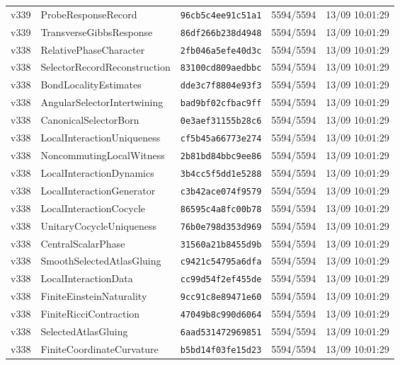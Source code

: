 \documentclass[11pt]{article}
\theoremstyle{definition}\newtheorem{deriv}{Derivação}
\begin{document}
{\begin{longtable}{@{}lllll@{}}
v339 & ProbeResponseRecord & \texttt{96cb5c4ee91c51a1} & 5594/5594 & 13/09 10:01:29 \\
v339 & TransverseGibbsResponse & \texttt{86df266b238d4948} & 5594/5594 & 13/09 10:01:29 \\
v338 & RelativePhaseCharacter & \texttt{2fb046a5efe40d3c} & 5594/5594 & 13/09 10:01:29 \\
v338 & SelectorRecordReconstruction & \texttt{83100cd809aedbbc} & 5594/5594 & 13/09 10:01:29 \\
v338 & BondLocalityEstimates & \texttt{dde3c7f8804e93f3} & 5594/5594 & 13/09 10:01:29 \\
v338 & AngularSelectorIntertwining & \texttt{bad9bf02cfbac9ff} & 5594/5594 & 13/09 10:01:29 \\
v338 & CanonicalSelectorBorn & \texttt{0e3aef31155b28c6} & 5594/5594 & 13/09 10:01:29 \\
v338 & LocalInteractionUniqueness & \texttt{cf5b45a66773e274} & 5594/5594 & 13/09 10:01:29 \\
v338 & NoncommutingLocalWitness & \texttt{2b81bd84bbc9ee86} & 5594/5594 & 13/09 10:01:29 \\
v338 & LocalInteractionDynamics & \texttt{3b4cc5f5dd1e5288} & 5594/5594 & 13/09 10:01:29 \\
v338 & LocalInteractionGenerator & \texttt{c3b42ace074f9579} & 5594/5594 & 13/09 10:01:29 \\
v338 & LocalInteractionCocycle & \texttt{86595c4a8fc00b78} & 5594/5594 & 13/09 10:01:29 \\
v338 & UnitaryCocycleUniqueness & \texttt{76b0e798d353d969} & 5594/5594 & 13/09 10:01:29 \\
v338 & CentralScalarPhase & \texttt{31560a21b8455d9b} & 5594/5594 & 13/09 10:01:29 \\
v338 & SmoothSelectedAtlasGluing & \texttt{c9421c54795a6dfa} & 5594/5594 & 13/09 10:01:29 \\
v338 & LocalInteractionData & \texttt{cc99d54f2ef455de} & 5594/5594 & 13/09 10:01:29 \\
v338 & FiniteEinsteinNaturality & \texttt{9cc91c8e89471e60} & 5594/5594 & 13/09 10:01:29 \\
v338 & FiniteRicciContraction & \texttt{47049b8c990d6064} & 5594/5594 & 13/09 10:01:29 \\
v338 & SelectedAtlasGluing & \texttt{6aad531472969851} & 5594/5594 & 13/09 10:01:29 \\
v338 & FiniteCoordinateCurvature & \texttt{b5bd14f03fe15d23} & 5594/5594 & 13/09 10:01:29 \\

\end{longtable}}
\end{document}
